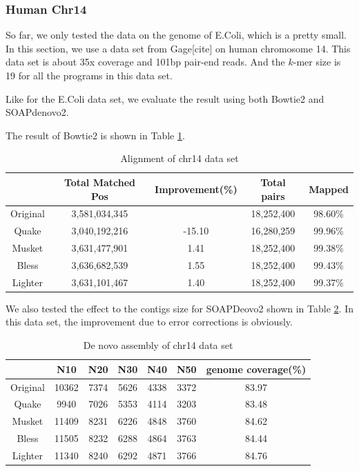 \documentclass[10pt]{article}
\begin{document}
\subsubsection*{Human Chr14}
So far, we only tested the data on the genome of E.Coli, which is a pretty small. In this section, we use a data set from Gage[cite] on human chromosome 14. This data set is about 35x coverage and 101bp pair-end reads. And the $k$-mer size is 19 for all the programs in this data set.

Like for the E.Coli data set, we evaluate the result using both Bowtie2 and SOAPdenovo2.

The result of Bowtie2 is shown in Table \ref{table:chr14_bowtie2}.

\begin{table}
\begin{tabular}{|c|c|c|c|c|}\hline
  & Total Matched Pos & Improvement(\%) & Total pairs & Mapped \\ \hline
Original &	3,581,034,345	&	& 18,252,400 & 98.60\% \\ \hline
Quake	& 3,040,192,216	& -15.10 &	16,280,259 &	99.96\% \\ \hline
Musket	& 3,631,477,901	& 1.41	& 18,252,400	& 99.38\% \\ \hline
Bless	& 3,636,682,539	& 1.55	& 18,252,400	& 99.43\% \\ \hline
Lighter	& 3,631,101,467	& 1.40	& 18,252,400	& 99.37\% \\ \hline
\end{tabular}
\caption{Alignment of chr14 data set\label{table:chr14_bowtie2}}
\end{table}

We also tested the effect to the contigs size for SOAPDeovo2 shown in Table \ref{table:chr14_sd2}. In this data set, the improvement due to error corrections is obviously. 

\begin{table}
\begin{tabular}{|c|c|c|c|c|c|c|} \hline
 		& N10 & N20 & N30 & N40 & N50 & genome coverage(\%)\\ \hline
Original	&			10362	& 7374	& 5626	& 4338	& 3372 & 83.97	 \\ \hline
Quake		&		9940	& 7026	& 5353	& 4114	&3203 & 83.48	 \\ \hline
Musket		&		11409	& 8231	& 6226	& 4848	&3760 & 84.62	\\ \hline
Bless		&		11505	& 8232	& 6288	& 4864	&3763 & 84.44	\\ \hline
Lighter		&		11340	& 8240	& 6292	& 4871	&3766 & 84.76 \\ \hline
\end{tabular}
\caption{De novo assembly of chr14 data set\label{table:chr14_sd2}}
\end{table}
\end{document}
